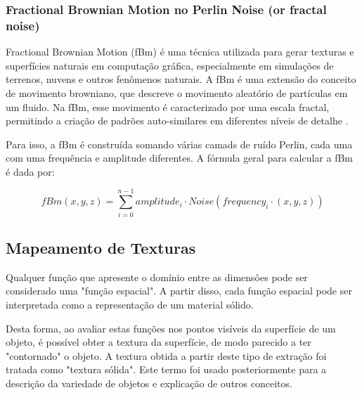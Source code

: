 \subsubsection{Fractional Brownian Motion no Perlin Noise (or fractal noise)}
Fractional Brownian Motion (fBm) é uma técnica utilizada para gerar texturas e superfícies naturais em computação gráfica, especialmente em simulações de terrenos, nuvens e outros fenômenos naturais. A fBm é uma extensão do conceito de movimento browniano, que descreve o movimento aleatório de partículas em um fluido. Na fBm, esse movimento é caracterizado por uma escala fractal, permitindo a criação de padrões auto-similares em diferentes níveis de detalhe \cite{fractalNoise}.

Para isso, a fBm é construída somando várias camads de ruído Perlin, cada uma com uma frequência e amplitude diferentes. A fórmula geral para calcular a fBm é dada por:

$$
fBm(x, y, z) = \sum_{i=0}^{n-1} amplitude_i \cdot Noise(frequency_i \cdot (x, y, z))
$$


\subsection{Mapeamento de Texturas}

Qualquer função que apresente o domínio entre as dimensôes pode ser considerado uma "função espacial". A partir disso, cada função espacial pode ser interpretada como a representação de um material sólido.

Desta forma, ao avaliar estas funções nos pontos visíveis da superfície de um objeto, é possível obter a textura da superfície, de modo parecido a ter "contornado" o objeto. A textura obtida a partir deste tipo de extração foi tratada como "textura sólida". Este termo foi usado posteriormente para a descrição da variedade de objetos e explicação de outros conceitos.

